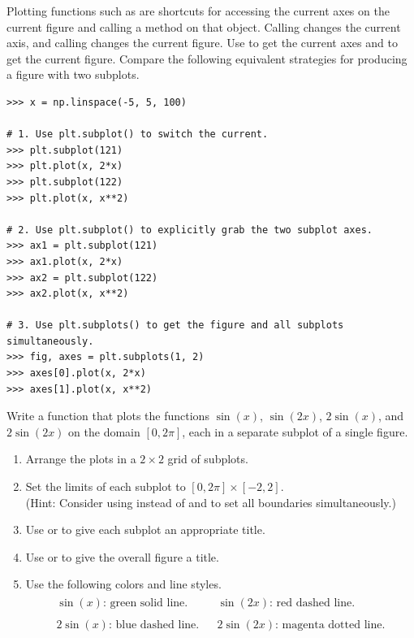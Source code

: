 \begin{info}
Plotting functions such as  are shortcuts for accessing the current axes on the current figure and calling a method on that  object.
Calling  changes the current axis, and calling  changes the current figure.
Use  to get the current axes and  to get the current figure.
Compare the following equivalent strategies for producing a figure with two subplots.

\begin{lstlisting}
>>> x = np.linspace(-5, 5, 100)

# 1. Use plt.subplot() to switch the current.
>>> plt.subplot(121)
>>> plt.plot(x, 2*x)
>>> plt.subplot(122)
>>> plt.plot(x, x**2)

# 2. Use plt.subplot() to explicitly grab the two subplot axes.
>>> ax1 = plt.subplot(121)
>>> ax1.plot(x, 2*x)
>>> ax2 = plt.subplot(122)
>>> ax2.plot(x, x**2)

# 3. Use plt.subplots() to get the figure and all subplots simultaneously.
>>> fig, axes = plt.subplots(1, 2)
>>> axes[0].plot(x, 2*x)
>>> axes[1].plot(x, x**2)
\end{lstlisting}

\end{info}

\begin{problem} %
Write a function that plots the functions $\sin(x)$, $\sin(2x)$, $2\sin(x)$, and $2\sin(2x)$ on the domain $[0, 2\pi]$, each in a separate subplot of a single figure.
\begin{enumerate}
    \item Arrange the plots in a $2\times 2$ grid of subplots.
    \item Set the limits of each subplot to $[0, 2\pi]\times[-2,2]$.
    \\(Hint: Consider using  instead of  and  to set all boundaries simultaneously.)
    \item Use  or  to give each subplot an appropriate title.
    \item Use  or  to give the overall figure a title.
    \item Use the following colors and line styles.
    \begin{align*}\begin{array}{rcl}
    \sin(x)\text{: green solid line.} && \sin(2x)\text{: red dashed line.}\\ \\
    2\sin(x)\text{: blue dashed line.} && 2\sin(2x)\text{: magenta dotted line.}
    \end{array}\end{align*}
\end{enumerate}
\end{problem}

